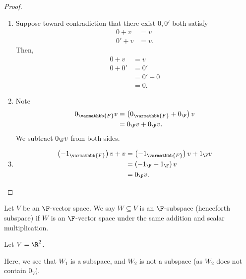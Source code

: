 \documentclass[10pt]{mypackage}
\renewcommand*{\mathbb}[1]{\varmathbb{#1}}
\begin{document}
\begin{proof}\hfill
  \begin{enumerate}[(1)]
    \item Suppose toward contradiction that there exist $0,0'$ both satisfy 
      \begin{align*}
        0 + v &= v\tag*{(\textasteriskcentered)}\\
        0' + v &= v.\tag*{(\textasteriskcentered\textasteriskcentered)}
      \end{align*}
      Then,
      \begin{align*}
        0 + v &= v\\
        0 + 0' &= 0'\tag*{by (\textasteriskcentered) with $v = 0'$}\\
               &= 0' + 0\\
               &= 0. \tag*{by (\textasteriskcentered\textasteriskcentered) with $v = 0$}
      \end{align*}
    \item Note
      \begin{align*}
        0_{\mathbb{F}}v &= \left(0_{\mathbb{F}} + 0_{\F}\right) v\\
                        &= 0_{\F}v + 0_{\F}v.
      \end{align*}
      We subtract $0_{\F}v$ from both sides.
    \item
      \begin{align*}
        \left(-1_{\mathbb{F}}\right)v + v &= \left(-1_{\mathbb{F}} \right)v + 1_{\F}v\\
                                          &= \left(-1_{\F} + 1_{\F}\right)v\\
                                          &= 0_{\F}v.
      \end{align*}
  \end{enumerate}
\end{proof}
\begin{definition}[Subspaces]
  Let $V$ be an $\F$-vector space. We say $W\subseteq V$ is an $\F$-subspace (henceforth subspace) if $W$ is an $\F$-vector space under the same addition and scalar multiplication.
\end{definition}
\begin{example}[Subspaces of $\R^2$]
  Let $V = \R^2$. 
  \begin{center}
  \end{center}
  Here, we see that $W_1$ is a subspace, and $W_2$ is not a subspace (as $W_2$ does not contain $0_{V}$).
\end{example}
\end{document}
